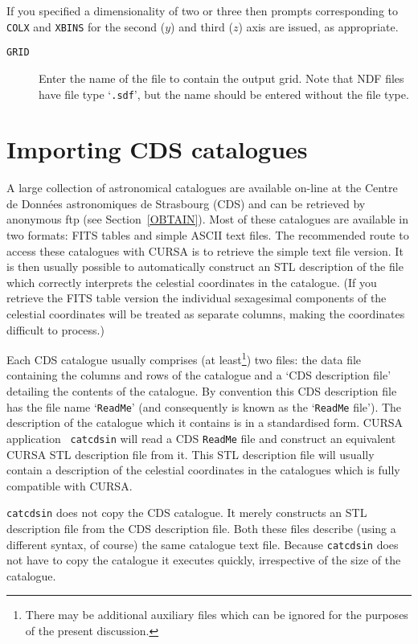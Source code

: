 \documentclass[twoside,11pt]{article}
\newcommand{\xlabel}[1]{}
\renewcommand{\_}{\texttt{\symbol{95}}}
\begin{document}
If you specified a dimensionality of two or three then prompts
corresponding to {\tt COLX} and {\tt XBINS} for the second ($y$\/)
and third ($z$\/) axis are issued, as appropriate.

\begin{description}

  \item[ {\tt GRID} ] Enter the name of the file to contain the output
   grid.  Note that NDF files have file type `{\tt .sdf}', but the
   name should be entered without the file type.

\end{description}


\section{\xlabel{CDSIN}\label{CDSIN}Importing CDS catalogues}

A large collection of astronomical catalogues are available on-line
at the Centre de Donn\'{e}es astronomiques de Strasbourg (CDS)
and can be retrieved by anonymous ftp (see Section~\ref{OBTAIN}).
Most of these catalogues are available in two formats: FITS tables
and simple ASCII text files.  The recommended route to access these
catalogues with CURSA is to retrieve the simple text file version.
It is then usually possible to automatically construct an STL description
of the file which correctly interprets the celestial coordinates in
the catalogue.  (If you retrieve the FITS table version the individual
sexagesimal components of the celestial coordinates will be treated as
separate columns, making the coordinates difficult to process.)

Each CDS catalogue usually comprises (at least\footnote{There may
be additional auxiliary files which can be ignored for the purposes
of the present discussion.}) two files: the data file containing the
columns and rows of the catalogue and a `CDS description file'
detailing the contents of the catalogue.  By convention this CDS
description file has the file name `{\tt ReadMe}' (and consequently
is known as the `{\tt ReadMe} file').  The description of the catalogue
which it contains is in a standardised form.  CURSA application {\tt
catcdsin} will read a CDS {\tt ReadMe} file and construct an equivalent
CURSA STL description file from it.  This STL description file will
usually contain a description of the celestial coordinates in the
catalogues which is fully compatible with CURSA.

{\tt catcdsin} does not copy the CDS catalogue.  It merely constructs
an STL description file from the CDS description file.  Both these
files describe (using a different syntax, of course) the same catalogue
text file.  Because {\tt catcdsin} does not have to copy the catalogue
it executes quickly, irrespective of the size of the catalogue.
\end{document}
